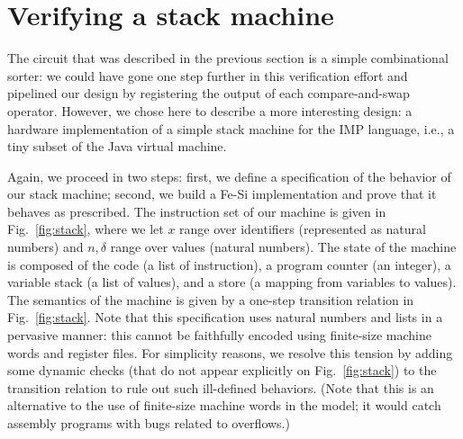 \documentclass{llncs}
\begin{document}
\section{Verifying a stack machine}
The circuit that was described in the previous section is a simple
combinational sorter: we could have gone one step further in this
verification effort and pipelined our design by registering the output
of each compare-and-swap operator. However, we chose here to describe
a more interesting design: a hardware implementation of a simple stack
machine for the IMP language, i.e., a tiny subset of the Java virtual
machine.

Again, we proceed in two steps: first, we define a specification of
the behavior of our stack machine; second, we build a Fe-Si
implementation and prove that it behaves as prescribed. 
%
The instruction set of our machine is given in Fig.~\ref{fig:stack},
where we let $x$ range over identifiers (represented as natural
numbers) and $n,\delta$ range over values (natural numbers).
%
The state of the machine is composed of the code (a list of
instruction), a program counter (an integer), a variable stack (a list
of values), and a store (a mapping from variables to values). The
semantics of the machine is given by a one-step transition relation in Fig.~\ref{fig:stack}.
%
Note that this specification uses natural numbers and lists in a
pervasive manner: this cannot be faithfully encoded using finite-size
machine words and register files. 
%
For simplicity reasons, we resolve this tension by adding some dynamic
checks (that do not appear explicitly on Fig.~\ref{fig:stack}) to the
transition relation to rule out such ill-defined behaviors. (Note
that this is an alternative to the use of finite-size machine words in
the model; it would catch assembly programs with bugs related to
overflows.)
\end{document}
